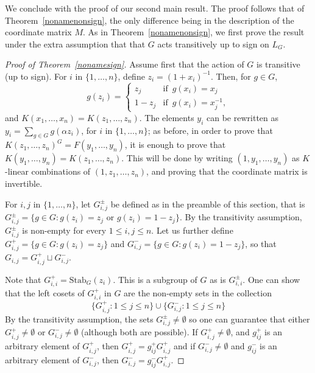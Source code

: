 \documentclass[12pt]{article}
\theoremstyle{plain}
\begin{document}
We conclude with the proof of our second main result.  The proof
follows that of Theorem~\ref{nonamenonsign}, the only difference being in
the description of the coordinate matrix $M$.  As in
Theorem~\ref{nonamenonsign}, we first prove the result under the extra
assumption that that $G$ acts transitively up to sign on $L_G$.

\begin{proof}[Proof of Theorem~\ref{nonamesign}]
  Assume first that the action of $G$ is transitive (up to sign).
  For $i$ in $\{1,\dots,n\}$, define $z_i = (1+x_i)^{-1} $. Then, for $g
  \in G$, $$g(z_i) = \begin{cases} z_j & \text{if} \,\,\, g(x_i) = x_j
    \\ 1-z_j & \text{if} \,\,\, g(x_i) = x_j^{-1},
  \end{cases}$$ 
  and $K(x_1, \ldots , x_n) = K(z_1, \ldots, z_n).$ The elements $y_i$
  can be rewritten as $y_i = \sum_{g \in G} g ({\alpha}z_i)$, for $i$
  in $\{1, \ldots, n\}$; as before, in order to prove that
  $K(z_1,\ldots, z_n)^G = F(y_1, \ldots, y_{n})$, it is enough to
  prove that $K(y_1,\dots,y_n)=K(z_1,\dots,z_n)$. This will be done by
  writing $(1,y_1,\dots,y_n)$ as $K$-linear combinations of
  $(1,z_1,\dots,z_n)$, and proving that the coordinate matrix is
  invertible.

  For $i,j$ in $\lbrace 1, \ldots , n \rbrace$, let $G^{\pm}_{i,j}$
  be defined as in the preamble of this section, that is 
  $G^{\pm}_{i,j}=\lbrace g \in G : g(z_i) = z_j \,\, \text{or} \,\, g(z_i) = 1-z_j
  \rbrace $. By the transitivity assumption, $G^{\pm}_{i,j}$ is
  non-empty for every $1 \leq i,j \leq n$. Let us further define $G^{+}_{i,j}
  = \lbrace g \in G : g(z_i) = z_j \rbrace$ and $G^{-}_{i,j} =
  \lbrace g \in G : g(z_i) = 1- z_j \rbrace$, so that $G_{i,j}=
  G^{+}_{i,j}\sqcup G^{-}_{i,j}$.  

Note that $G^+_{i,i}=\textrm{Stab}_G(z_i)$.  This is a subgroup of $G$ as is $G^{\pm}_{i,i}$.  One can show that the left cosets of $G^+_{i,i}$ in $G$ are the non-empty sets in the collection
$$\{G^+_{i,j}:1\le j\le n\} \cup \{G^-_{i,j}: 1\le j\le n\}$$
By the transitivity assumption, the sets $G^{\pm}_{i,j}\ne \emptyset$
so one can guarantee that either $G^+_{i,j}\ne \emptyset$ or $G^-_{i,j}\ne \emptyset$ (although both are possible).  If $G^+_{i,j}\ne \emptyset$, and $g_{ij}^+$ is an arbitrary element of $G^+_{i,j}$, then 
$G^+_{i,j}=g_{ij}^+G^+_{i,j}$ and if $G^-_{i,j}\ne \emptyset$ and $g_{ij}^-$ is an arbitrary element of $G^-_{i,j}$, then 
$G^-_{i,j}=g_{ij}^-G^+_{i,j}$.
  

\end{proof}
\end{document}
